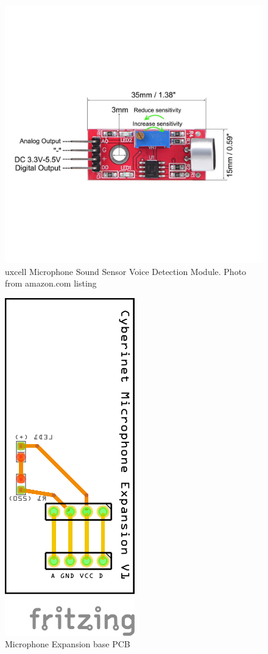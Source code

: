 \begin{figure}
    \centering
    \includegraphics[scale=0.3]{diagrams/mic.jpg}
    \caption{uxcell Microphone Sound Sensor Voice Detection Module. Photo from amazon.com listing}
    \label{fig:micExpansion}
\end{figure}

\begin{figure}
    \centering
    \includegraphics[angle=90]{diagrams/PCBs/micBasic_pcb.png}
    \caption{Microphone Expansion base PCB}
    \label{fig:micExPCB}
\end{figure}

